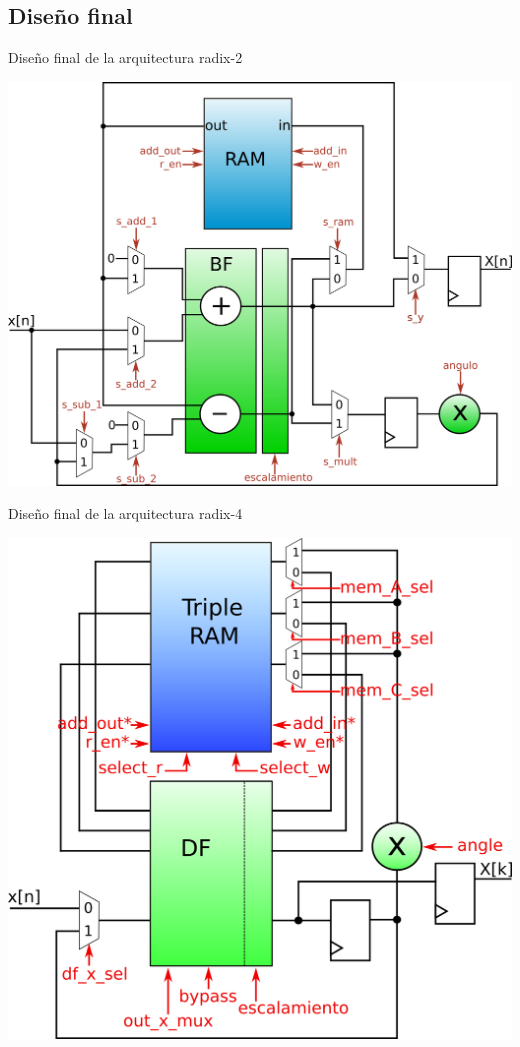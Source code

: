 \subsection{Diseño final}

\begin{frame}{Diseño final de la arquitectura radix-2}
  \begin{center}
    \advance\leftskip-0.2cm
    \includegraphics[scale=0.4]{./figures/datapathMem.png}
  \end{center}
\end{frame}

\begin{frame}{Diseño final de la arquitectura radix-4}
  \begin{center}
    \advance\leftskip-0.2cm
    \includegraphics[scale=0.4]{./figures/datapathR4control.png}
  \end{center}
\end{frame}


